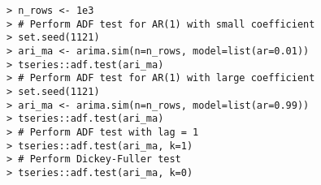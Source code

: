 \documentclass[10pt]{beamer}\usepackage[]{graphicx}\usepackage[]{color}
\makeatletter
\newenvironment{kframe}{%
 \def\at@end@of@kframe{}%
 \ifinner\ifhmode%
  \def\at@end@of@kframe{\end{minipage}}%
  \begin{minipage}{\columnwidth}%
 \fi\fi%
 \def\FrameCommand##1{\hskip\@totalleftmargin \hskip-\fboxsep
 \colorbox{shadecolor}{##1}\hskip-\fboxsep
     \hskip-\linewidth \hskip-\@totalleftmargin \hskip\columnwidth}%
 \MakeFramed {\advance\hsize-\width
   \@totalleftmargin\z@ \linewidth\hsize
   \@setminipage}}%
 {\par\unskip\endMakeFramed%
 \at@end@of@kframe}
\newenvironment{knitrout}{}{} %
\makeatother
\begin{document}
\begin{frame}[fragile,t]{\subsecname}
\begin{block}{}
\begin{columns}[T]
\begin{knitrout}
\begin{kframe}
\begin{verbatim}
> n_rows <- 1e3
> # Perform ADF test for AR(1) with small coefficient
> set.seed(1121)
> ari_ma <- arima.sim(n=n_rows, model=list(ar=0.01))
> tseries::adf.test(ari_ma)
> # Perform ADF test for AR(1) with large coefficient
> set.seed(1121)
> ari_ma <- arima.sim(n=n_rows, model=list(ar=0.99))
> tseries::adf.test(ari_ma)
> # Perform ADF test with lag = 1
> tseries::adf.test(ari_ma, k=1)
> # Perform Dickey-Fuller test
> tseries::adf.test(ari_ma, k=0)
\end{verbatim}
\end{kframe}
\end{knitrout}
  \end{columns}
\end{block}

\end{frame}


\end{document}
